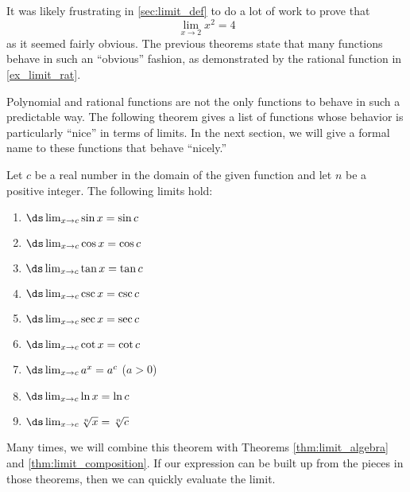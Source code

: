 It was likely frustrating in \autoref{sec:limit_def} to do a lot of work to prove that
\[\lim_{x\to 2} x^2 = 4\]
as it seemed fairly obvious. The previous theorems state that many functions behave in such an ``obvious'' fashion, as demonstrated by the rational function in \autoref{ex_limit_rat}. 

Polynomial and rational functions are not the only functions to behave in such a predictable way. The following theorem gives a list of functions whose behavior is particularly ``nice'' in terms of limits. In the next section, we will give a formal name to these functions that behave ``nicely.''

{
\begin{theorem}\label{thm:lim_continuous}
Let $c$ be a real number in the domain of the given function and let $n$ be a positive integer. The following limits hold:
\begin{multicols}{3}
\begin{enumerate}
\item	$\ds \lim_{x\to c} \sin x = \sin c$
\item	$\ds \lim_{x\to c} \cos x = \cos c$
\item	$\ds \lim_{x\to c} \tan x = \tan c$
\item	$\ds \lim_{x\to c} \csc x = \csc c$
\item	$\ds \lim_{x\to c} \sec x = \sec c$
\item	$\ds \lim_{x\to c} \cot x = \cot c$
\item	$\ds \lim_{x\to c} a^x = a^c$ ($a>0$)
\item	$\ds \lim_{x\to c} \ln x = \ln c$
\item	$\ds \lim_{x\to c} \sqrt[n]{x} = \sqrt[n]{c}$
\end{enumerate}
\end{multicols}
\end{theorem}
}

Many times, we will combine this theorem with Theorems \ref{thm:limit_algebra} and \ref{thm:limit_composition}.  If our expression can be built up from the pieces in those theorems, then we can quickly evaluate the limit.

